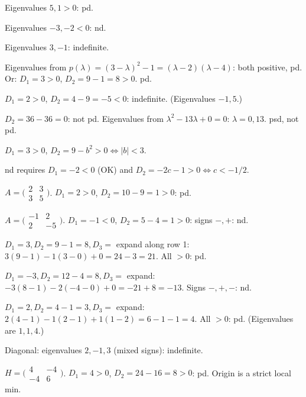 \begin{solutions}
    \item Eigenvalues $5, 1 > 0$: pd.
    \item Eigenvalues $-3, -2 < 0$: nd.
    \item Eigenvalues $3, -1$: indefinite.
    \item Eigenvalues from $p(\lambda) = (3 - \lambda)^{2} - 1 = (\lambda - 2)(\lambda - 4)$: both positive, pd. Or: $D_{1} = 3 > 0$, $D_{2} = 9 - 1 = 8 > 0$. pd.
    \item $D_{1} = 2 > 0$, $D_{2} = 4 - 9 = -5 < 0$: indefinite. (Eigenvalues $-1, 5$.)
    \item $D_{2} = 36 - 36 = 0$: not pd. Eigenvalues from $\lambda^{2} - 13 \lambda + 0 = 0$: $\lambda = 0, 13$. psd, not pd.
    \item $D_{1} = 3 > 0$, $D_{2} = 9 - b^{2} > 0 \Leftrightarrow |b| < 3$.
    \item nd requires $D_{1} = -2 < 0$ (OK) and $D_{2} = -2 c - 1 > 0 \Leftrightarrow c < -1/2$.
    \item $A = \bigl(\begin{smallmatrix} 2 & 3 \\ 3 & 5 \end{smallmatrix}\bigr)$. $D_{1} = 2 > 0$, $D_{2} = 10 - 9 = 1 > 0$: pd.
    \item $A = \bigl(\begin{smallmatrix} -1 & 2 \\ 2 & -5 \end{smallmatrix}\bigr)$. $D_{1} = -1 < 0$, $D_{2} = 5 - 4 = 1 > 0$: signs $-, +$: nd.
    \item $D_{1} = 3, D_{2} = 9 - 1 = 8, D_{3} = $ expand along row 1: $3(9 - 1) - 1(3 - 0) + 0 = 24 - 3 = 21$. All $> 0$: pd.
    \item $D_{1} = -3, D_{2} = 12 - 4 = 8, D_{3} = $ expand: $-3(8 - 1) - 2(-4 - 0) + 0 = -21 + 8 = -13$. Signs $-, +, -$: nd.
    \item $D_{1} = 2, D_{2} = 4 - 1 = 3, D_{3} = $ expand: $2(4 - 1) - 1(2 - 1) + 1(1 - 2) = 6 - 1 - 1 = 4$. All $> 0$: pd. (Eigenvalues are $1, 1, 4$.)
    \item Diagonal: eigenvalues $2, -1, 3$ (mixed signs): indefinite.
    \item $H = \bigl(\begin{smallmatrix} 4 & -4 \\ -4 & 6 \end{smallmatrix}\bigr)$. $D_{1} = 4 > 0$, $D_{2} = 24 - 16 = 8 > 0$: pd. Origin is a strict local min.

\end{solutions}
